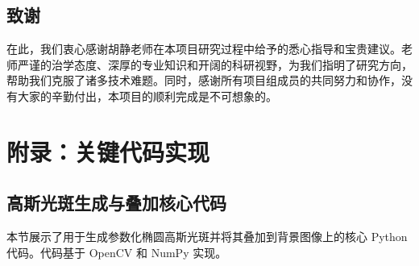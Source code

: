 \documentclass[12pt, a4paper]{report}
\begin{document}
\section*{致谢}
在此，我们衷心感谢胡静老师在本项目研究过程中给予的悉心指导和宝贵建议。老师严谨的治学态度、深厚的专业知识和开阔的科研视野，为我们指明了研究方向，帮助我们克服了诸多技术难题。同时，感谢所有项目组成员的共同努力和协作，没有大家的辛勤付出，本项目的顺利完成是不可想象的。

\appendix
\chapter{附录：关键代码实现}
\section{高斯光斑生成与叠加核心代码}
本节展示了用于生成参数化椭圆高斯光斑并将其叠加到背景图像上的核心 Python 代码。代码基于 OpenCV 和 NumPy 实现。
\end{document}
